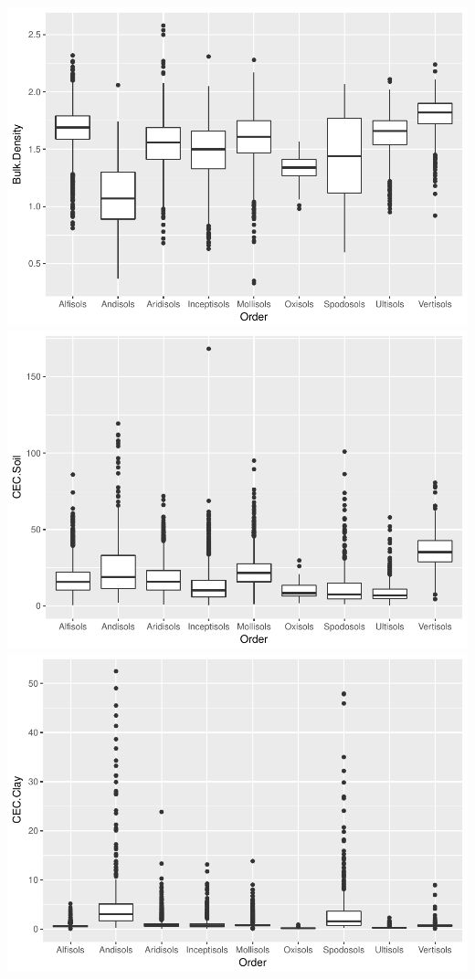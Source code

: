 \documentclass[]{article}
\begin{document}
\includegraphics{Project1_files/figure-latex/EDA - Mer-4.pdf}
\includegraphics{Project1_files/figure-latex/EDA - Mer-5.pdf}
\includegraphics{Project1_files/figure-latex/EDA - Mer-6.pdf}
\end{document}
